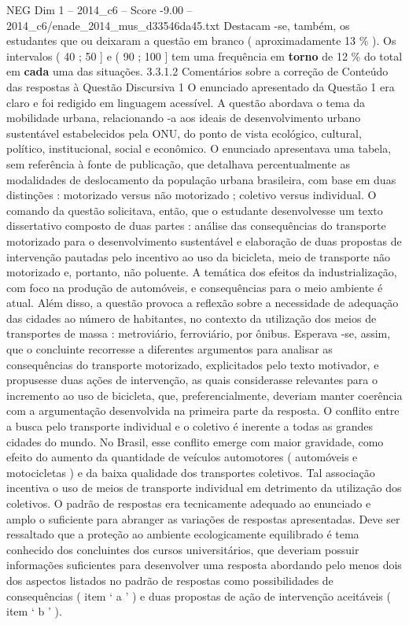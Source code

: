 \begin{textsample}{NEG Dim 1 – 2014\_c6 – Score -9.00 – 2014\_c6/enade\_2014\_mus\_d33546da45.txt}
Destacam -se, também, os estudantes que ou deixaram a questão em branco ( aproximadamente 13 \% ).
Os intervalos ( 40 ; 50 ] e ( 90 ; 100 ] tem uma frequência em \textbf{torno} de 12 \% do total em \textbf{cada} uma das situações. 3.3.1.2 Comentários sobre a correção de Conteúdo das respostas à Questão Discursiva 1 O enunciado apresentado da Questão 1 era claro e foi redigido em linguagem acessível.
A questão abordava o tema da mobilidade urbana, relacionando -a aos ideais de desenvolvimento urbano sustentável estabelecidos pela ONU, do ponto de vista ecológico, cultural, político, institucional, social e econômico.
O enunciado apresentava uma tabela, sem referência à fonte de publicação, que detalhava percentualmente as modalidades de deslocamento da população urbana brasileira, com base em duas distinções : motorizado versus não motorizado ; coletivo versus individual.
O comando da questão solicitava, então, que o estudante desenvolvesse um texto dissertativo composto de duas partes : análise das consequências do transporte motorizado para o desenvolvimento sustentável e elaboração de duas propostas de intervenção pautadas pelo incentivo ao uso da bicicleta, meio de transporte não motorizado e, portanto, não poluente.
A temática dos efeitos da industrialização, com foco na produção de automóveis, e consequências para o meio ambiente é atual.
Além disso, a questão provoca a reflexão sobre a necessidade de adequação das cidades ao número de habitantes, no contexto da utilização dos meios de transportes de massa : metroviário, ferroviário, por ônibus.
Esperava -se, assim, que o concluinte recorresse a diferentes argumentos para analisar as consequências do transporte motorizado, explicitados pelo texto motivador, e propusesse duas ações de intervenção, as quais considerasse relevantes para o incremento ao uso de bicicleta, que, preferencialmente, deveriam manter coerência com a argumentação desenvolvida na primeira parte da resposta.
O conflito entre a busca pelo transporte individual e o coletivo é inerente a todas as grandes cidades do mundo.
No Brasil, esse conflito emerge com maior gravidade, como efeito do aumento da quantidade de veículos automotores ( automóveis e motocicletas ) e da baixa qualidade dos transportes coletivos.
Tal associação incentiva o uso de meios de transporte individual em detrimento da utilização dos coletivos.
O padrão de respostas era tecnicamente adequado ao enunciado e amplo o suficiente para abranger as variações de respostas apresentadas.
Deve ser ressaltado que a proteção ao ambiente ecologicamente equilibrado é tema conhecido dos concluintes dos cursos universitários, que deveriam possuir informações suficientes para desenvolver uma resposta abordando pelo menos dois dos aspectos listados no padrão de respostas como possibilidades de consequências ( item ‘ a ’ ) e duas propostas de ação de intervenção aceitáveis ( item ‘ b ’ ).

\end{textsample}
